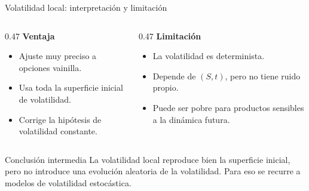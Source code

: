 \documentclass[8pt]{beamer}
\begin{document}
\begin{frame}{Volatilidad local: interpretación y limitación}
\begin{columns}[T]
\begin{column}{0.47\textwidth}
\textbf{Ventaja}

\begin{itemize}
    \item Ajuste muy preciso a opciones vainilla.
    \item Usa toda la superficie inicial de volatilidad.
    \item Corrige la hipótesis de volatilidad constante.
\end{itemize}

\end{column}
\begin{column}{0.47\textwidth}
\textbf{Limitación}

\begin{itemize}
    \item La volatilidad es determinista.
    \item Depende de $(S,t)$, pero no tiene ruido propio.
    \item Puede ser pobre para productos sensibles a la dinámica futura.
\end{itemize}

\end{column}
\end{columns}
\pause

\vspace{0.25cm}
\begin{block}{Conclusión intermedia}
La volatilidad local reproduce bien la superficie inicial, pero no introduce una evolución aleatoria de la volatilidad. Para eso se recurre a modelos de volatilidad estocástica.
\end{block}
\end{frame}
\end{document}
